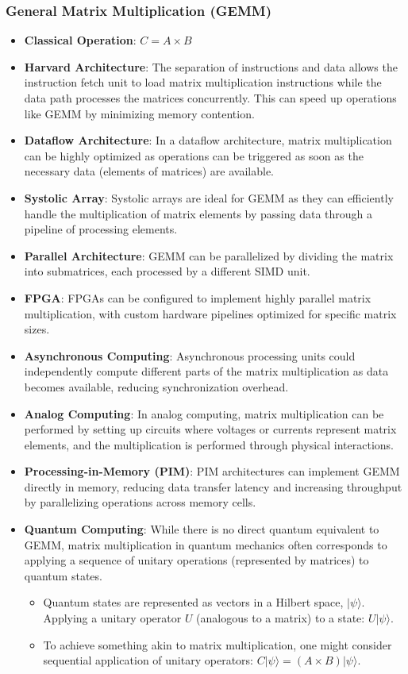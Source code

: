 \documentclass{article}
\begin{document}
\subsubsection{General Matrix Multiplication (GEMM)}
\begin{itemize}
    \item \textbf{Classical Operation}: \( C = A \times B \)
    \item \textbf{Harvard Architecture}: The separation of instructions and data allows the instruction fetch unit to load matrix multiplication instructions while the data path processes the matrices concurrently. This can speed up operations like GEMM by minimizing memory contention.
    \item \textbf{Dataflow Architecture}: In a dataflow architecture, matrix multiplication can be highly optimized as operations can be triggered as soon as the necessary data (elements of matrices) are available.
    \item \textbf{Systolic Array}: Systolic arrays are ideal for GEMM as they can efficiently handle the multiplication of matrix elements by passing data through a pipeline of processing elements.
    \item \textbf{Parallel Architecture}: GEMM can be parallelized by dividing the matrix into submatrices, each processed by a different SIMD unit.
    \item \textbf{FPGA}: FPGAs can be configured to implement highly parallel matrix multiplication, with custom hardware pipelines optimized for specific matrix sizes.
    \item \textbf{Asynchronous Computing}: Asynchronous processing units could independently compute different parts of the matrix multiplication as data becomes available, reducing synchronization overhead.
    \item \textbf{Analog Computing}: In analog computing, matrix multiplication can be performed by setting up circuits where voltages or currents represent matrix elements, and the multiplication is performed through physical interactions.
    \item \textbf{Processing-in-Memory (PIM)}: PIM architectures can implement GEMM directly in memory, reducing data transfer latency and increasing throughput by parallelizing operations across memory cells.
    \item \textbf{Quantum Computing}: While there is no direct quantum equivalent to GEMM, matrix multiplication in quantum mechanics often corresponds to applying a sequence of unitary operations (represented by matrices) to quantum states. 
    \begin{itemize}
        \item Quantum states are represented as vectors in a Hilbert space, \(|\psi\rangle\). Applying a unitary operator \( U \) (analogous to a matrix) to a state: \( U|\psi\rangle \). 
        \item To achieve something akin to matrix multiplication, one might consider sequential application of unitary operators: \( C|\psi\rangle = (A \times B)|\psi\rangle \).
    \end{itemize}
\end{itemize}
\end{document}
